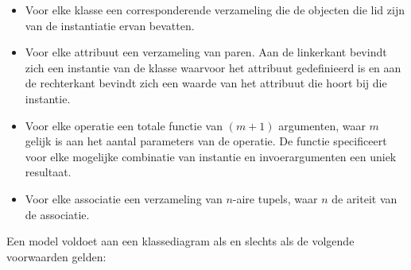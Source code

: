 \begin{itemize}
	\item Voor elke klasse een corresponderende verzameling die de objecten die lid zijn van de instantiatie ervan bevatten.
	\item Voor elke attribuut een verzameling van paren. Aan de linkerkant bevindt zich een instantie van de klasse waarvoor het attribuut gedefinieerd is en aan de rechterkant bevindt zich een waarde van het attribuut die hoort bij die instantie.
	\item Voor elke operatie een totale functie van $(m+1)$ argumenten, waar $m$ gelijk is aan het aantal parameters van de operatie. De functie specificeert voor elke mogelijke combinatie van instantie en invoerargumenten een uniek resultaat.
	\item Voor elke associatie een verzameling van $n$-aire tupels, waar $n$ de ariteit van de associatie.
\end{itemize}

Een model voldoet aan een klassediagram als en slechts als de volgende voorwaarden gelden:


